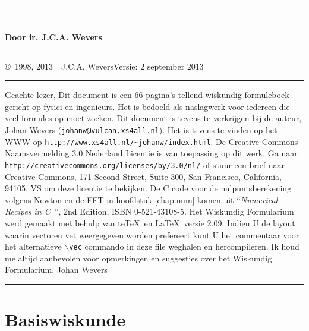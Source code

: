 \documentclass[twoside]{report}
\begin{document}
\thispagestyle{empty}
\hrule
\rule{.4pt}{22.35cm}\hspace*{161.62mm}\rule{.4pt}{22.35cm}
\vspace*{-17cm}
\begin{center}
\Huge
{}
\end{center}
\vspace{2cm}
\centerline{\Large\bf Door ir. J.C.A. Wevers}
\vfill
\hrule
\newpage
\thispagestyle{empty}
\copyright~1998, 2013~~J.C.A. Wevers\hfill Versie: 2 september 2013
\npar
\hrule
\par
\bigskip
Geachte lezer,
\npar
Dit document is een 66 pagina's tellend wiskundig formuleboek gericht
op fysici en ingenieurs. Het is bedoeld als naslagwerk voor iedereen die
veel formules op moet zoeken.
\npar
Dit document is tevens te verkrijgen bij de auteur, Johan Wevers ({\tt johanw@vulcan.xs4all.nl}).
\npar
Het is tevens te vinden op het WWW op {\tt http://www.xs4all.nl/\~{}johanw/index.html}.
\npar
De Creative Commons Naamsvermelding 3.0 Nederland Licentie is van toepassing op
dit werk.
Ga naar {\tt http://creativecommons.org/licenses/by/3.0/nl/} of stuur een brief naar Creative Commons, 171 Second Street, Suite 300, San Francisco, California, 94105, VS om deze licentie te bekijken.
\npar
De C code voor de nulpuntsberekening volgens Newton en de FFT in hoofdstuk
\ref{chap:num} komen uit ``{\it Numerical Recipes in C}~'', 2nd Edition,
ISBN 0-521-43108-5.
\npar
Het Wiskundig Formularium werd gemaakt met behulp van te\TeX\ en \LaTeX\ versie 2.09.
\npar
Indien U de layout waarin vectoren vet weergegeven worden prefereert kunt U
het commentaar voor het alternatieve {\tt $\backslash$vec} commando in deze
file weghalen en hercompileren.
\npar
Ik houd me altijd aanbevolen voor opmerkingen en suggesties over het
Wiskundig Formularium.
\npar
Johan Wevers
\vfill
\hrule

\newpage

\tableofcontents
\cleardoublepage


\renewcommand{\chaptermark}[1]{\markboth{#1}{#1}}

\chapter{Basiswiskunde}
\end{document}
